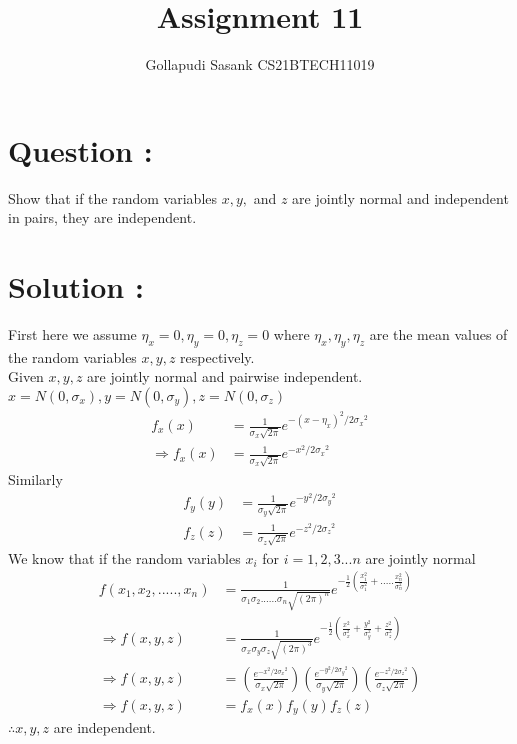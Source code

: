 \documentclass[journal,twocolumn,12pt]{IEEEtran}
\title{Assignment 11}
\author{Gollapudi Sasank CS21BTECH11019}
\providecommand{\brak}[1]{\ensuremath{\left(#1\right)}}
\begin{document}
\maketitle
\section*{Question : }
Show that if the random variables $x,y,$ and $z$ are jointly normal and independent in pairs, they are independent.
\section*{Solution : }
First here we assume $\eta_x = 0 ,\eta_y = 0 ,\eta_z = 0 $ where $\eta_x,\eta_y,\eta_z$ are the mean values of the random variables $x,y,z$ respectively.\\
Given $x,y,z$ are jointly normal and pairwise independent.\\
$x = N(0,\sigma_x) , y = N(0,\sigma_y) , z = N(0,\sigma_z)$\\
\begin{align}
f_x(x) &= \frac{1}{\sigma_x\sqrt{2\pi}} e^{-{(x-\eta_x)}^{2}/2        {\sigma_x}^{2}} \\
\Rightarrow f_x(x) &= \frac{1}{\sigma_x\sqrt{2\pi}} e^{-x^{2}/2{\sigma_x}^{2}} 
\end{align}
Similarly 
\begin{align}
f_y(y) &= \frac{1}{\sigma_y\sqrt{2\pi}} e^{-y^{2}/2{\sigma_y}^{2}} \\
f_z(z) &= \frac{1}{\sigma_z\sqrt{2\pi}} e^{-z^{2}/2{\sigma_z}^{2}}
\end{align}
We know that if the random variables $x_i$ for $i = 1,2,3...n$ are jointly normal 
\begin{align}
f(x_1,x_2,.....,x_n) &= \frac{1}{\sigma_1\sigma_2......\sigma_n \sqrt{{(2\pi)}^n}} e^{{-\frac{1}{2} \brak{\frac{x_1^2}{\sigma_1^2} +..... \frac{x_n^2}{\sigma_n^2} } }} \\
\Rightarrow f(x,y,z) &= \frac{1}{\sigma_x\sigma_y\sigma_z \sqrt{{(2\pi)}^3}} e^{-\frac{1}{2} \brak{ \frac{x^2}{\sigma_x^2} + \frac{y^2}{\sigma_y^2} + \frac{z^2}{\sigma_z^2} } } \\ 
\Rightarrow f(x,y,z) &= \brak{\frac{e^{-x^{2}/2{\sigma_x}^{2}}}{\sigma_x\sqrt{2\pi}}} \brak{\frac{e^{-y^{2}/2{\sigma_y}^{2}}}{\sigma_y\sqrt{2\pi}}} \brak{\frac{e^{-z^{2}/2{\sigma_z}^{2}}}{\sigma_z\sqrt{2\pi}}} \\
\Rightarrow f(x,y,z) &= f_x(x) f_y(y) f_z(z)
\end{align}
$\therefore x,y,z$ are independent.
\end{document}
